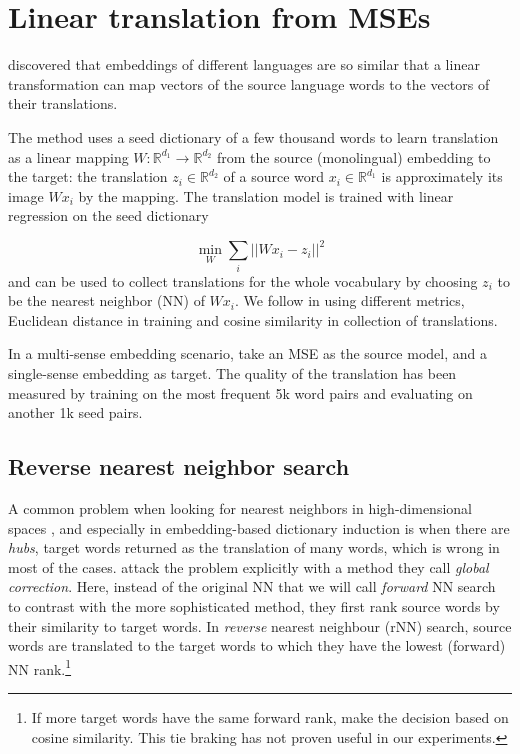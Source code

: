 \documentclass[11pt]{article}
\newcommand{\Ro}{\mathbb{R}^{d_1}}
\newcommand{\Rt}{\mathbb{R}^{d_2}}
\begin{document}
\section{Linear translation from MSEs}

 \cite{Mikolov:2013x} discovered that embeddings of different languages are so
 similar that a linear transformation can map vectors of the source language
 words to the vectors of their translations.

The method uses a seed dictionary of a few thousand words to learn translation
as a linear mapping $W: \mathbb{R}^{d_1}\rightarrow \mathbb{R}^{d_2}$ from the
source (monolingual) embedding to the target: the translation $z_i \in \Rt$ of
a source word $x_i \in \Ro$ is approximately its image $Wx_i$ by the mapping.
The translation model is trained with linear regression on the seed dictionary 

\[\min_W \sum_i || Wx_i - z_i ||^2 \] 
and can be used to collect translations for the whole vocabulary by choosing
$z_i$ to be the nearest neighbor (NN) of $Wx_i$.  We follow
\cite{Mikolov:2013x} in using different metrics, Euclidean distance in training
and cosine similarity in collection of translations.


In a multi-sense embedding scenario, \cite{Borbely:2016} take an MSE as the
source model, and a single-sense embedding as target.  The quality of the
translation has been measured by training on the most frequent 5k word pairs
and evaluating on another 1k seed pairs.

\subsection{Reverse nearest neighbor search}


A common problem when looking for nearest neighbors in high-dimensional spaces
\citep{Radovanovic:2010,Suzuki:2013,Tomasev:2013}, and especially 
in embedding-based dictionary induction \citep{Dinu:2015,Lazaridou:2015} is
when there are \emph{hubs}, target words returned as the translation of many
words, which is wrong in most of the cases.  \cite{Dinu:2015} attack the
problem explicitly with a method they call \emph{global correction}.  Here,
instead of the original NN that we will call \emph{forward} NN search to
contrast with the more sophisticated method, they first rank source words by
their similarity to target words. In \emph{reverse} nearest neighbour (rNN)
search, source words are translated to the target words to which they have the
lowest (forward) NN rank.\footnote{If more target words have the same forward
rank, \cite{Dinu:2015} make the decision based on cosine similarity. This tie
braking has not proven useful in our experiments.}
\end{document}

